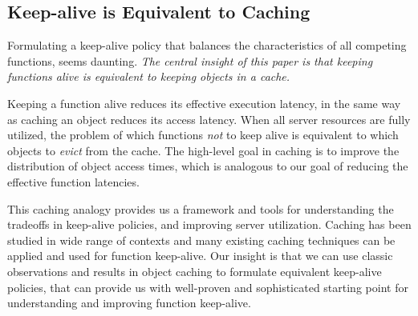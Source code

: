 \vspace*{\subsecspace}
\subsection{Keep-alive is Equivalent to Caching}
\vspace*{\subsecspace}

Formulating a keep-alive policy that balances the characteristics of all competing functions, seems daunting. 
\emph{The central insight of this paper is that keeping functions alive is equivalent to keeping objects in a cache.} 


Keeping a function alive reduces its effective execution latency, in the same way as caching an object reduces its access latency. 
When all server resources are fully utilized, the problem of which functions \emph{not} to keep alive is equivalent to which objects to \emph{evict} from the cache. 
The high-level goal in caching is to improve the distribution of object access times, which is analogous to our goal of reducing the effective function latencies. 


This caching analogy provides us a framework and tools for understanding the tradeoffs in keep-alive policies, and improving server utilization. 
Caching has been studied in wide range of contexts and many existing caching techniques can be applied and used for function keep-alive. 
Our insight is that we can use classic observations and results in object caching to formulate equivalent keep-alive policies, that can provide us with well-proven and sophisticated starting point for understanding and improving function keep-alive.  






